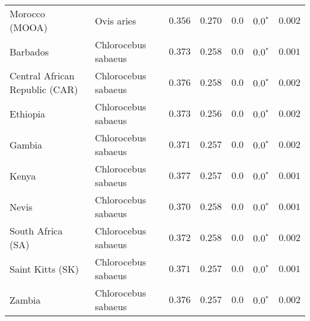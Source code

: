 \begin{center}
\begin{adjustbox}{width = 1\textwidth}
\begin{tabular}{|l|l|r|r|r|r|r|}
                 Morocco (MOOA) &           Ovis aries &                                           $ 0.356$ &                                           $ 0.270$ &            $0.0$ &                  $\bm{0.0{^*}}$ &           $ 0.002$ \\
                       Barbados &  Chlorocebus sabaeus &                                           $ 0.373$ &                                           $ 0.258$ &            $0.0$ &                  $\bm{0.0{^*}}$ &           $ 0.001$ \\
 Central African Republic (CAR) &  Chlorocebus sabaeus &                                           $ 0.376$ &                                           $ 0.258$ &            $0.0$ &                  $\bm{0.0{^*}}$ &           $ 0.002$ \\
                       Ethiopia &  Chlorocebus sabaeus &                                           $ 0.373$ &                                           $ 0.256$ &            $0.0$ &                  $\bm{0.0{^*}}$ &           $ 0.002$ \\
                         Gambia &  Chlorocebus sabaeus &                                           $ 0.371$ &                                           $ 0.257$ &            $0.0$ &                  $\bm{0.0{^*}}$ &           $ 0.002$ \\
                          Kenya &  Chlorocebus sabaeus &                                           $ 0.377$ &                                           $ 0.257$ &            $0.0$ &                  $\bm{0.0{^*}}$ &           $ 0.001$ \\
                          Nevis &  Chlorocebus sabaeus &                                           $ 0.370$ &                                           $ 0.258$ &            $0.0$ &                  $\bm{0.0{^*}}$ &           $ 0.001$ \\
              South Africa (SA) &  Chlorocebus sabaeus &                                           $ 0.372$ &                                           $ 0.258$ &            $0.0$ &                  $\bm{0.0{^*}}$ &           $ 0.002$ \\
               Saint Kitts (SK) &  Chlorocebus sabaeus &                                           $ 0.371$ &                                           $ 0.257$ &            $0.0$ &                  $\bm{0.0{^*}}$ &           $ 0.001$ \\
                         Zambia &  Chlorocebus sabaeus &                                           $ 0.376$ &                                           $ 0.257$ &            $0.0$ &                  $\bm{0.0{^*}}$ &           $ 0.002$ \\

\end{tabular}
\end{adjustbox}
\end{center}
